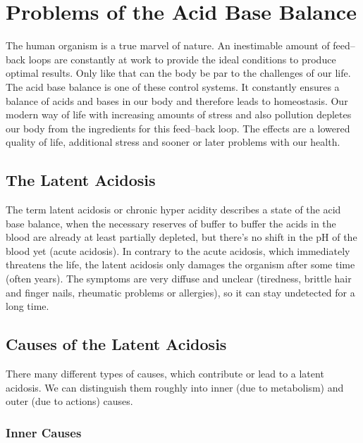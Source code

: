 \documentclass[../main.tex]{subfiles}
\begin{document}
\section{Problems of the Acid Base Balance}

The human organism is a true marvel of nature.
An inestimable amount of feed--back loops are constantly at work to provide the ideal conditions to  produce optimal results.
Only like that can the body be par to the challenges of our life.
The acid base balance is one of these control systems.
It constantly ensures a balance of acids and bases in our body and therefore leads to homeostasis.
Our modern way of life with increasing amounts of stress and also pollution depletes our body from the ingredients for this feed--back loop.
The effects are a lowered quality of life, additional stress and sooner or later problems with our health.

\subsection{The Latent Acidosis}

The term latent acidosis or chronic hyper acidity describes a state
of the acid base balance, when the necessary reserves of buffer to buffer the acids in the blood are already at least partially depleted,
but there's no shift in the pH of the blood yet (acute acidosis).
In contrary to the acute acidosis, which immediately threatens the life,
the latent acidosis only damages the organism after some time (often years).
The symptoms are very diffuse and unclear (tiredness, brittle hair and finger nails, rheumatic problems or allergies),
so it can stay undetected for a long time.

\subsection{Causes of the Latent Acidosis}

There many different types of causes, which contribute or lead to a latent acidosis.
We can distinguish them roughly into inner (due to metabolism) and outer (due to actions) causes.

\subsubsection{Inner Causes}
\end{document}
